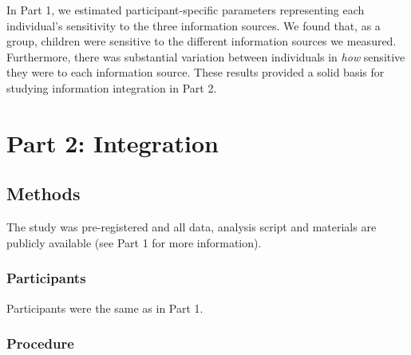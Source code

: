 \documentclass[
  man,floatsintext]{apa6}
\begin{document}
In Part 1, we estimated participant-specific parameters representing each individual's sensitivity to the three information sources. We found that, as a group, children were sensitive to the different information sources we measured. Furthermore, there was substantial variation between individuals in \emph{how} sensitive they were to each information source. These results provided a solid basis for studying information integration in Part 2.

\hypertarget{part-2-integration}{%
\section{Part 2: Integration}\label{part-2-integration}}

\hypertarget{methods-1}{%
\subsection{Methods}\label{methods-1}}

The study was pre-registered and all data, analysis script and materials are publicly available (see Part 1 for more information).

\hypertarget{participants-1}{%
\subsubsection{Participants}\label{participants-1}}

Participants were the same as in Part 1.

\hypertarget{procedure}{%
\subsubsection{Procedure}\label{procedure}}
\end{document}

